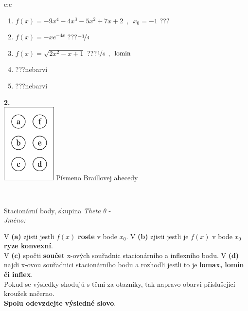 \documentclass[10pt]{report}
\begin{document}
\begin{tabular}{c:c}
\begin{minipage}[c][104.5mm][t]{0.5\linewidth}
\begin{center}
\begin{minipage}{0.79\linewidth}
\begin{center}
\begin{varwidth}{\linewidth}
\begin{enumerate}
\item $f(x)=-9x^4-4x^3-5x^2+7x+2\enspace , \enspace x_0=-1$\quad \dotfill\; ???\;\dotfill \quad {}
\item $f(x)=-xe^{-4x}$\quad \dotfill\; ???\;\dotfill \quad $\nicefrac{-1}{4}$
\item $f(x)=\sqrt{2x^2-x+1}$\quad \dotfill\; ???\;\dotfill \quad $\nicefrac{1}{4}\enspace , \enspace \mathrm{lomin}$
\item \quad \dotfill\; ???\;\dotfill \quad nebarvi
\item \quad \dotfill\; ???\;\dotfill \quad nebarvi
\end{enumerate}
\end{varwidth}
\end{center}
\end{minipage}
\begin{minipage}{0.20\linewidth}
\begin{center}
{\Huge\bfseries 2.} \\[2mm]
\includegraphics[height=40mm]{../images/braille.png}
{\small Písmeno Braillovej abecedy}
\end{center}
\end{minipage}
\end{center}
\end{minipage}
\\ \hdashline
\begin{minipage}[c][104.5mm][t]{0.5\linewidth}
\begin{center}
\vspace{7mm}
{\huge Stacionární body, skupina \textit{Theta $\theta$} -}\\[5mm]
\textit{Jméno:}\phantom{xxxxxxxxxxxxxxxxxxxxxxxxxxxxxxxxxxxxxxxxxxxxxxxxxxxxxxxxxxxxxxxxx}\\[5mm]
\begin{minipage}{0.95\linewidth}
\begin{center}
{\small V \textbf{(a)} zjisti jestli $f(x)$ \textbf{roste} v bode $x_0$. V \textbf{(b)} zjisti jestli je $f(x)$ v bode $x_0$ \textbf{ryze konvexní}.\\V \textbf{(c)} spočti \textbf{součet} x-ových souřadnic stacionárního a inflexního bodu. V \textbf{(d)} najdi x-ovou souřadnici stacionárního bodu a rozhodli jestli to je \textbf{lomax, lomin či inflex}.\\Pokud se výsledky shodujú s těmi za otazníky, tak napravo obarvi příslušející kroužek načerno.\\\textbf{Spolu odevzdejte výsledné slovo}}.

\end{center}
\end{minipage}
\end{center}
\end{minipage}
\end{tabular}
\end{document}
